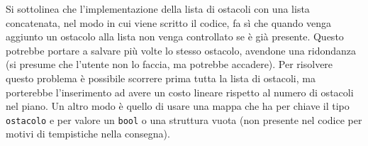 \documentclass[a4paper,11pt]{article}
\begin{document}
Si sottolinea che l'implementazione della lista di ostacoli con una lista concatenata, nel modo in cui viene scritto il codice, fa sì che quando venga aggiunto un ostacolo alla lista non venga controllato se è già presente. Questo potrebbe portare a salvare più volte lo stesso ostacolo, avendone una ridondanza (si presume che l'utente non lo faccia, ma potrebbe accadere). Per risolvere questo problema è possibile scorrere prima tutta la lista di ostacoli, ma porterebbe l'inserimento ad avere un costo lineare rispetto al numero di ostacoli nel piano. Un altro modo è quello di usare una mappa che ha per chiave il tipo \texttt{ostacolo} e per valore un \texttt{bool} o una struttura vuota (non presente nel codice per motivi di tempistiche nella consegna).
\end{document}
